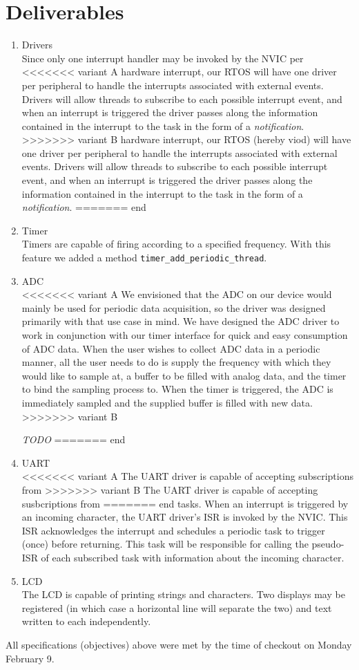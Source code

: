 \documentclass[12pt]{article}
\newcommand{\todo}{{\LARGE \emph{\color{red}TODO}}}
\begin{document}
\section{Deliverables}
\begin{enumerate}
\item Drivers \\
  Since only one interrupt handler may be invoked by the NVIC per
<<<<<<< variant A
  hardware interrupt, our RTOS will have one driver per peripheral to
  handle the interrupts associated with external events. Drivers will
  allow threads to subscribe to each possible interrupt event, and
  when an interrupt is triggered the driver passes along the
  information contained in the interrupt to the task in the form of a
  \emph{notification}.
>>>>>>> variant B
  hardware interrupt, our RTOS (hereby viod) will have one driver per
  peripheral to handle the interrupts associated with external
  events. Drivers will allow threads to subscribe to each possible
  interrupt event, and when an interrupt is triggered the driver
  passes along the information contained in the interrupt to the task
  in the form of a \emph{notification}.
======= end
\item Timer \\
  Timers are capable of firing according to a specified
  frequency. With this feature we added a method
  \verb|timer_add_periodic_thread|.
\item ADC \\
<<<<<<< variant A
  We envisioned that the ADC on our device would mainly be used for
  periodic data acquisition, so the driver was designed primarily with
  that use case in mind. We have designed the ADC driver to work in
  conjunction with our timer interface for quick and easy consumption
  of ADC data. When the user wishes to collect ADC data in a periodic
  manner, all the user needs to do is supply the frequency with which
  they would like to sample at, a buffer to be filled with analog
  data, and the timer to bind the sampling process to. When the timer
  is triggered, the ADC is immediately sampled and the supplied buffer
  is filled with new data.
>>>>>>> variant B

  \todo
======= end
\item UART \\
<<<<<<< variant A
  The UART driver is capable of accepting subscriptions from
>>>>>>> variant B
  The UART driver is capable of accepting susbcriptions from
======= end
  tasks. When an interrupt is triggered by an incoming character, the
  UART driver's ISR is invoked by the NVIC. This ISR acknowledges the
  interrupt and schedules a periodic task to trigger (once) before
  returning. This task will be responsible for calling the pseudo-ISR
  of each subscribed task with information about the incoming
  character.
\item LCD \\
  The LCD is capable of printing strings and characters. Two displays
  may be registered (in which case a horizontal line will separate the
  two) and text written to each independently.
\end{enumerate}
All specifications (objectives) above were met by the time of checkout
on Monday February 9.
\end{document}
